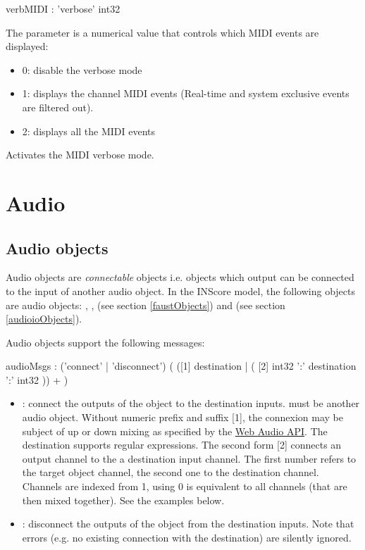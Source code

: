 \documentclass[a4paper,twoside]{article}
\newcommand{\toplevel}[1]	{\section{#1}}
\newcommand{\sublevel}[1]	{\subsection{#1}}
\begin{document}
\begin{rail}
verbMIDI : 'verbose' int32
\end{rail}

The parameter is a numerical value that controls which MIDI events are displayed: 
\begin{itemize}
\item 0: disable the verbose mode
\item 1: displays the channel MIDI events (Real-time and system exclusive events are filtered out).
\item 2: displays all the MIDI events
\end{itemize}


\example
{}
Activates the MIDI verbose mode.


\toplevel{Audio}
\label{audioObjects}

\sublevel{Audio objects}
\label{audioObjects}

Audio objects are \emph{connectable} objects i.e. objects which output can be connected to the input of another audio object. In the INScore model, the following objects are audio objects: , ,  (see section \ref{faustObjects}) and  (see section \ref{audioioObjects}).

Audio objects support the following messages:

\begin{rail}
audioMsgs : ('connect' | 'disconnect') ( ([1] destination 
			|  ( [2] int32 ':' destination ':' int32 )) + ) 
\end{rail}

\begin{itemize}
\item {}: connect the outputs of the object to the destination inputs.  must be another audio object. Without  numeric prefix and suffix [1], the connexion may be subject of up or down mixing as specified by the \href{https://www.w3.org/TR/webaudio/#channel-up-mixing-and-down-mixing}{Web Audio API}. The destination supports regular expressions. The second form [2] connects an output channel to the a destination input channel. The first number refers to the target object channel, the second one to the destination channel. Channels are indexed from 1, using 0 is equivalent to all channels (that are then mixed together). See the examples below.
\item {}: disconnect the outputs of the object from the destination inputs. Note that errors (e.g. no existing connection with the destination) are silently ignored.
\end{itemize}
\end{document}
